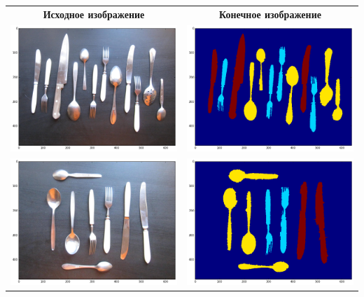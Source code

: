 \documentclass[12pt, a4paper]{article}
\begin{document}
        \begin{center}
        \begin{tabular}{c c}
            {\bf Исходное изображение} & {\bf Конечное изображение} \\
            \includegraphics[width=8cm]{0.png} & \includegraphics[width=8cm]{9.png} \\
            \includegraphics[width=8cm]{00.png} & \includegraphics[width=8cm]{99.png} \\
        \end{tabular}
        \end{center}
\end{document}
